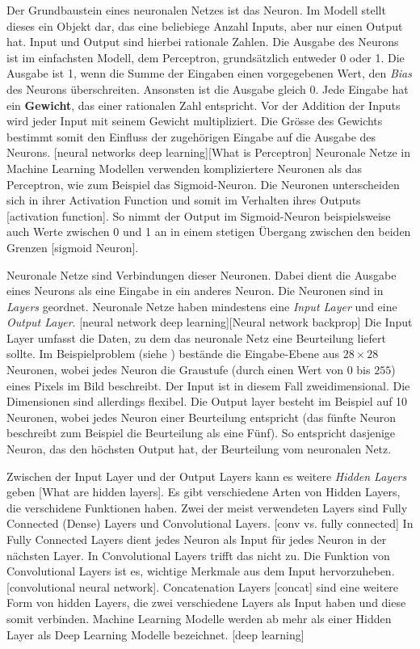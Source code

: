 Der Grundbaustein eines neuronalen Netzes ist das Neuron. Im Modell stellt
dieses ein Objekt dar, das eine beliebiege Anzahl Inputs, aber nur einen Output
hat. Input und Output sind hierbei rationale Zahlen. Die Ausgabe des Neurons ist
im einfachsten Modell, dem Perceptron, grundsätzlich entweder 0 oder 1. Die
Ausgabe ist 1, wenn die Summe der Eingaben einen vorgegebenen Wert, den
\emph{Bias} des Neurons überschreiten. Ansonsten ist die Ausgabe gleich 0. Jede
Eingabe hat ein \textbf{Gewicht}, das einer rationalen Zahl entspricht. Vor der
Addition der Inputs wird jeder Input mit seinem Gewicht multipliziert.  Die
Grösse des Gewichts bestimmt somit den Einfluss der zugehörigen Eingabe auf die
Ausgabe des Neurons. [neural networks deep learning][What is Perceptron]
Neuronale Netze in Machine Learning Modellen verwenden kompliziertere Neuronen
als das Perceptron, wie zum Beispiel das Sigmoid-Neuron. Die Neuronen
unterscheiden sich in ihrer Activation Function und somit im Verhalten ihres
Outputs [activation function]. So nimmt der Output im Sigmoid-Neuron
beispielsweise auch Werte zwischen 0 und 1 an in einem stetigen Übergang
zwischen den beiden Grenzen [sigmoid Neuron].


Neuronale Netze sind Verbindungen dieser Neuronen. Dabei dient die Ausgabe eines
Neurons als eine Eingabe in ein anderes Neuron. Die Neuronen sind in
\emph{Layers} geordnet. Neuronale Netze haben mindestens eine \emph{Input Layer}
und eine \emph{Output Layer}. [neural network deep learning][Neural network
backprop] Die Input Layer umfasst die Daten, zu dem das neuronale Netz eine
Beurteilung liefert sollte. Im Beispielproblem (siehe )
bestände die Eingabe-Ebene aus $28\times28$ Neuronen, wobei jedes Neuron die
Graustufe (durch einen Wert von 0 bis $255$) eines Pixels im Bild beschreibt.
Der Input ist in diesem Fall zweidimensional. Die Dimensionen sind allerdings
flexibel. Die Output layer besteht im Beispiel auf 10 Neuronen, wobei jedes
Neuron einer Beurteilung entspricht (das fünfte Neuron beschreibt zum Beispiel
die Beurteilung als eine Fünf). So entspricht dasjenige Neuron, das den höchsten
Output hat, der Beurteilung vom neuronalen Netz.

Zwischen der Input Layer und der Output Layers kann es weitere \emph{Hidden
Layers} geben [What are hidden layers]. Es gibt verschiedene Arten von Hidden
Layers, die verschidene Funktionen haben. Zwei der meist verwendeten Layers sind
Fully Connected (Dense) Layers und Convolutional Layers. [conv vs. fully
connected] In Fully Connected Layers dient jedes Neuron als Input für jedes
Neuron in der nächsten Layer. In Convolutional Layers trifft das nicht zu. Die
Funktion von Convolutional Layers ist es, wichtige Merkmale aus dem Input
hervorzuheben. [convolutional neural network]. Concatenation Layers [concat]
sind eine weitere Form von hidden Layers, die zwei verschiedene Layers als Input
haben und diese somit verbinden. Machine Learning Modelle werden ab mehr als
einer Hidden Layer als Deep Learning Modelle bezeichnet. [deep learning]


